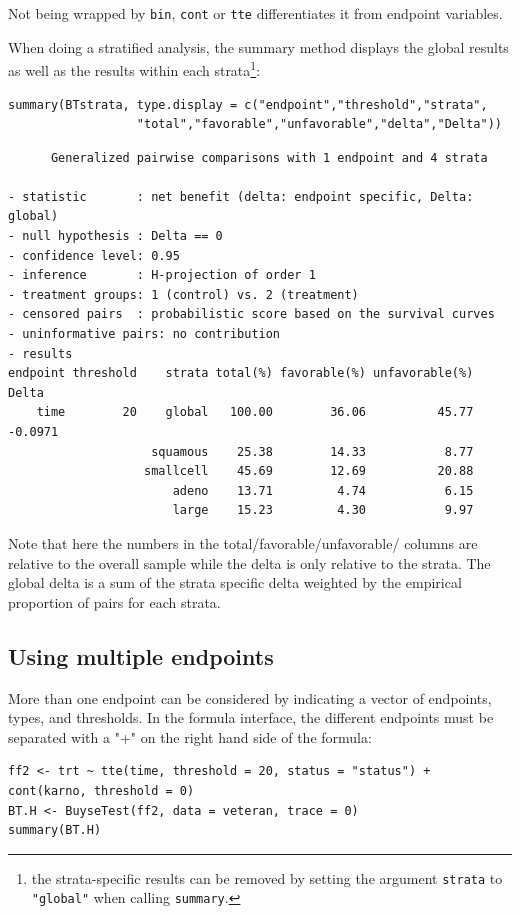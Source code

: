 \documentclass[12pt]{article}
\begin{document}
Not being wrapped by \texttt{bin}, \texttt{cont} or \texttt{tte} differentiates it from
endpoint variables.

\bigskip

When doing a stratified analysis, the summary method displays the
global results as well as the results within each strata\footnote{the
strata-specific results can be removed by setting the argument
\texttt{strata} to \texttt{"global"} when calling \texttt{summary}.}:
\lstset{language=r,label= ,caption= ,captionpos=b,numbers=none}
\begin{lstlisting}
summary(BTstrata, type.display = c("endpoint","threshold","strata",
			      "total","favorable","unfavorable","delta","Delta"))
\end{lstlisting}

\begin{verbatim}
      Generalized pairwise comparisons with 1 endpoint and 4 strata

- statistic       : net benefit (delta: endpoint specific, Delta: global) 
- null hypothesis : Delta == 0 
- confidence level: 0.95 
- inference       : H-projection of order 1
- treatment groups: 1 (control) vs. 2 (treatment) 
- censored pairs  : probabilistic score based on the survival curves
- uninformative pairs: no contribution
- results
endpoint threshold    strata total(%) favorable(%) unfavorable(%)   Delta
    time        20    global   100.00        36.06          45.77 -0.0971
                    squamous    25.38        14.33           8.77        
                   smallcell    45.69        12.69          20.88        
                       adeno    13.71         4.74           6.15        
                       large    15.23         4.30           9.97
\end{verbatim}

Note that here the numbers in the total/favorable/unfavorable/ columns
are relative to the overall sample while the delta is only relative to
the strata. The global delta is a sum of the strata specific delta
weighted by the empirical proportion of pairs for each strata.

\clearpage

\subsection{Using multiple endpoints}
\label{sec:org80497ab}
More than one endpoint can be considered by indicating a vector of
endpoints, types, and thresholds. In the formula interface, the
different endpoints must be separated with a "+" on the right hand
side of the formula:
\lstset{language=r,label= ,caption= ,captionpos=b,numbers=none}
\begin{lstlisting}
ff2 <- trt ~ tte(time, threshold = 20, status = "status") + cont(karno, threshold = 0)
BT.H <- BuyseTest(ff2, data = veteran, trace = 0)
summary(BT.H)
\end{lstlisting}
\end{document}
